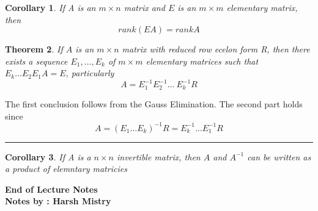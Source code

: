 \documentclass{article}
\newcounter{lecnum}
\newtheorem{theorem}{Theorem}[lecnum]
\newtheorem{corollary}[theorem]{Corollary}
\newenvironment{proof}{{\bf Proof:}}{\hfill\rule{2mm}{2mm}}
\begin{document}
\begin{corollary}
If A is an \(m \times n\) matrix and \(E\) is an \(m \times m \) elementary matrix, then 
$$rank(EA) = rankA$$
\end{corollary}

\begin{theorem}
If \(A\) is an \(m \times n\) matrix with reduced row ecelon form R, then there exists a sequence \(E_1, \ldots , E_k\) of \(m \times m\) elementary matrices such that \(E_k \ldots E_2 E_1 A = E\), particularly 
$$ A = E_1^{-1}E_2^{-1} \ldots \ E_k^{-1}R $$
\end{theorem}

\begin{proof}
The first conclusion follows from the Gauss Elimination. The second part holds since 
$$ A  = (E_1 \ldots E_k)^{-1}R = E_k^{-1} \ldots E_1^{-1}R $$
\end{proof}

\begin{corollary}
If A is a \(n \times n\) invertible matrix, then \(A\) and \(A^{-1}\) can be written as a product of elemntary matricies 
\end{corollary}


\begin{center}
\textbf{End of Lecture Notes}\\
\textbf{Notes by : Harsh Mistry}
\end{center}
\end{document}
